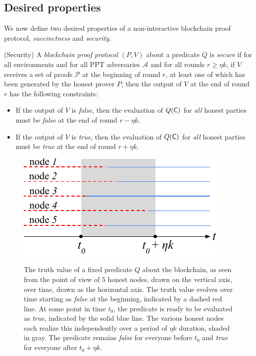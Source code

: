 \subsection{Desired properties}

We now define two desired properties of a non-interactive blockchain proof
protocol, \emph{succinctness} and \emph{security}.

\begin{definition}{(Security)}
A \emph{blockchain proof protocol} $(P, V)$ about a predicate $Q$ is
\emph{secure} if for all environments and for all PPT adversaries $\mathcal{A}$
and for all rounds $r \geq \eta k$, if $V$ receives a set of proofs
$\mathcal{P}$ at the beginning of round $r$, at least one of which has been
generated by the honest prover $P$, then the output of $V$ at the end of round
$r$ has the following constraints:
\begin{itemize}
  \item If the output of $V$ is \emph{false}, then the evaluation of $Q(\mathsf{C})$
        for \emph{all} honest parties must be \emph{false} at the end of round
        $r - \eta k$.
  \item If the output of $V$ is \emph{true}, then the evaluation of $Q(\mathsf{C})$
        for \emph{all} honest parties must be \emph{true} at the end of round
        $r + \eta k$.
\end{itemize}
\end{definition}

\begin{figure}
    \caption{The truth value of a fixed predicate $Q$ about the blockchain, as
             seen from the point of view of $5$ honest nodes, drawn on the
             vertical axis, over time, drawn as the horizontal axis. The truth
             value evolves over time starting as \emph{false} at the beginning,
             indicated by a dashed red line. At some point in time $t_0$, the
             predicate is ready to be evaluated as \emph{true}, indicated by the
             solid blue line. The various honest nodes each realize this
             independently over a period of $\eta k$ duration, shaded in gray.
             The predicate remains \emph{false} for everyone before $t_0$ and
             \emph{true} for everyone after $t_0 + \eta k$.}
    \centering
    \includegraphics[width=0.5\columnwidth,keepaspectratio]{chapters/work/figures/predicate-evolution.pdf}
    \label{fig.evolution}
\end{figure}


